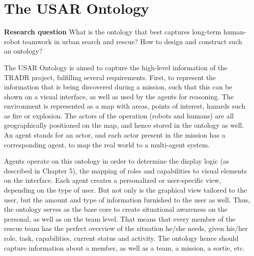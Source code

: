 \chapter{The USAR Ontology}
\textbf{Research question} What is the ontology that best captures long-term human-robot teamwork in urban search and rescue? How to design and construct such an ontology?

The USAR Ontology is aimed to capture the high-level information of the TRADR project, fulfilling several requirements. First, to represent the information that is being discovered during a mission, such that this can be shown on a visual interface, as well as used by the agents for reasoning. 
The environment is represented as a map with areas, points of interest, hazards such as fire or explosion. The actors of the operation (robots and humans) are all geographically positioned on the map, and hence stored in the ontology as well. An agent stands for an actor, and each actor present in the mission has a corresponding agent, to map the real world to a multi-agent system. 

Agents operate on this ontology in order to determine the display logic (as described in Chapter 5), the mapping of roles and capabilities to visual elements on the interface. Each agent creates a personalized or user-specific view, depending on the type of user. But not only is the graphical view tailored to the user, but the amount and type of information furnished to the user as well. Thus, the ontology serves as the base core to create situational awareness on the personal, as well as on the team level. That means that every member of the rescue team has the perfect overview of the situation he/she needs, given his/her role, task, capabilities, current status and activity. The ontology hence should capture information about a member, as well as a team, a mission, a sortie, etc.
 
